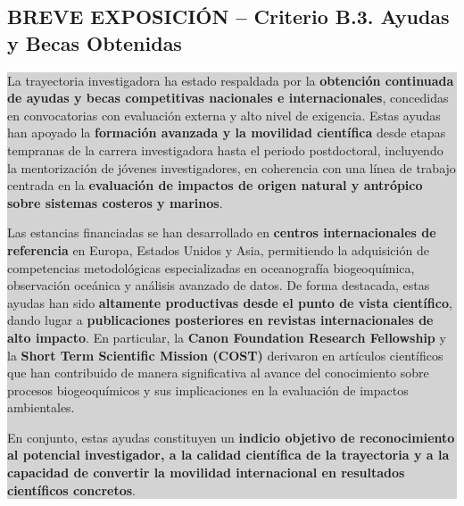 \documentclass[11pt,a4paper]{article}
\newcommand{\breveexposicion}[2]{
    \subsection*{\color{darkgray}\textbf{BREVE EXPOSICIÓN -- #1}}
    \vspace{0.3em}
    \noindent\colorbox{lightgray}{%
        \begin{minipage}{0.97\textwidth}
        \vspace{0.5em}
        \color{darkgray}
        #2
        \vspace{0.5em}
        \end{minipage}
    }
    \vspace{1em}
}
\begin{document}
\breveexposicion{Criterio B.3. Ayudas y Becas Obtenidas}{
La trayectoria investigadora ha estado respaldada por la \textbf{obtención continuada de ayudas y becas competitivas nacionales e internacionales}, concedidas en convocatorias con evaluación externa y alto nivel de exigencia. Estas ayudas han apoyado la \textbf{formación avanzada y la movilidad científica} desde etapas tempranas de la carrera investigadora hasta el periodo postdoctoral, incluyendo la mentorización de jóvenes investigadores, en coherencia con una línea de trabajo centrada en la \textbf{evaluación de impactos de origen natural y antrópico sobre sistemas costeros y marinos}.

Las estancias financiadas se han desarrollado en \textbf{centros internacionales de referencia} en Europa, Estados Unidos y Asia, permitiendo la adquisición de competencias metodológicas especializadas en oceanografía biogeoquímica, observación oceánica y análisis avanzado de datos. De forma destacada, estas ayudas han sido \textbf{altamente productivas desde el punto de vista científico}, dando lugar a \textbf{publicaciones posteriores en revistas internacionales de alto impacto}. En particular, la \textbf{Canon Foundation Research Fellowship} y la \textbf{Short Term Scientific Mission (COST)} derivaron en artículos científicos que han contribuido de manera significativa al avance del conocimiento sobre procesos biogeoquímicos y sus implicaciones en la evaluación de impactos ambientales.

En conjunto, estas ayudas constituyen un \textbf{indicio objetivo de reconocimiento al potencial investigador, a la calidad científica de la trayectoria y a la capacidad de convertir la movilidad internacional en resultados científicos concretos}.
}
\end{document}
